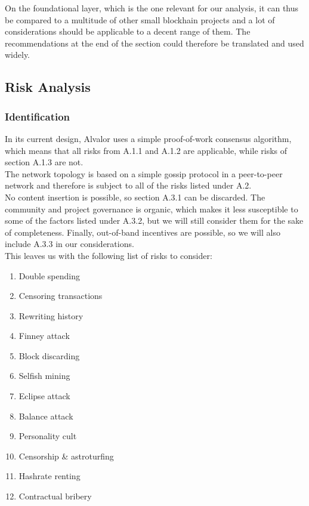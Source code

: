 \documentclass[12pt,a4paper]{article}
\begin{document}
On the foundational layer, which is the one relevant for our analysis, it can thus be compared to a multitude of other small blockhain projects and a lot of considerations should be applicable to a decent range of them. The recommendations at the end of the section could therefore be translated and used widely.\\

\subsection{Risk Analysis}

\subsubsection{Identification}

In its current design, Alvalor uses a simple proof-of-work consensus algorithm, which means that all risks from A.1.1 and A.1.2 are applicable, while risks of section A.1.3 are not.\\

The network topology is based on a simple gossip protocol in a peer-to-peer network and therefore is subject to all of the risks listed under A.2.\\

No content insertion is possible, so section A.3.1 can be discarded. The community and project governance is organic, which makes it less susceptible to some of the factors listed under A.3.2, but we will still consider them for the sake of completeness. Finally, out-of-band incentives are possible, so we will also include A.3.3 in our considerations.\\

This leaves us with the following list of risks to consider:
\begin{enumerate}
  \item Double spending
  \item Censoring transactions
  \item Rewriting history
  \item Finney attack
  \item Block discarding
  \item Selfish mining
  \item Eclipse attack
  \item Balance attack
  \item Personality cult
  \item Censorship \& astroturfing
  \item Hashrate renting
  \item Contractual bribery
\end{enumerate}
\end{document}

